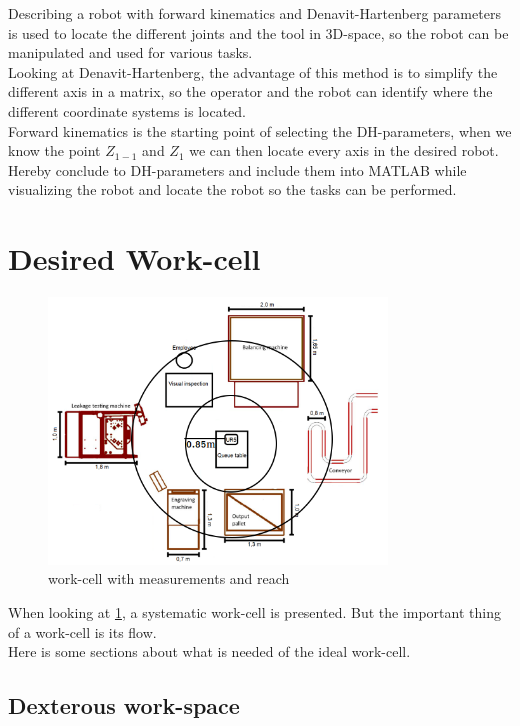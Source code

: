 Describing a robot with forward kinematics and Denavit-Hartenberg parameters is used to locate the different joints and the tool in 3D-space, so the robot can be manipulated and used for various tasks.\\
Looking at Denavit-Hartenberg, the advantage of this method is to simplify the different axis in a matrix, so the operator and the robot can identify where the different coordinate systems is located.\\
Forward kinematics is the starting point of selecting the DH-parameters, when we know the point $Z_{1-1}$ and $Z_1$ we can then locate every axis in the desired robot. Hereby conclude to DH-parameters and include them into MATLAB while visualizing the robot and locate the robot so the tasks can be performed.\\

\section{Desired Work-cell}

\begin{figure}[h]
    \centering
    \includegraphics[width=9cm]{Design/Work_cell_3.png}
    \caption{work-cell with measurements and reach}
    \label{fig:workcellMR}
\end{figure}

When looking at \ref{fig:workcellMR}, a systematic work-cell is presented. But the important thing of a work-cell is its flow.\\
Here is some sections about what is needed of the ideal work-cell.

\subsection{Dexterous work-space}

